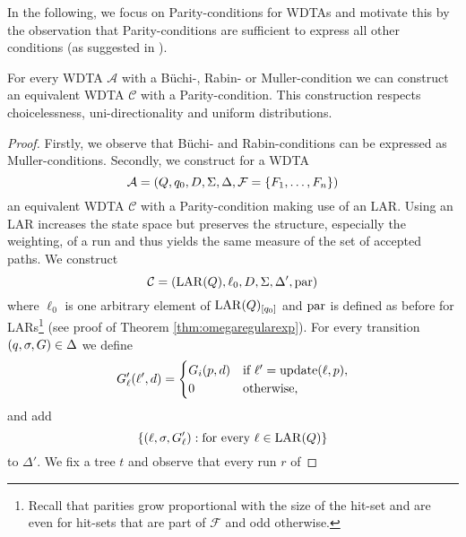 In the following, we focus on Parity-conditions for \acp{WDTA} and motivate
this by the observation that Parity-conditions are sufficient to express all
other conditions (as suggested in
\cite[page 24:9, Proposition 6]{RandAutoInfTrees}).
\begin{lemma}
  For every \ac{WDTA} $\mathcal{A}$ with a Büchi-, Rabin- or Muller-condition 
  we can construct an equivalent \ac{WDTA} $\mathcal{C}$ with a 
  Parity-condition. This construction respects choicelessness,
  uni-directionality and uniform distributions.
  \label{lem:wdtaparityexpressiveness}
\end{lemma}
\begin{proof}
  Firstly, we observe that Büchi- and Rabin-conditions can be expressed
  as Muller-conditions. Secondly, we construct for a 
  \ac{WDTA}
  \begin{equation*}
    \mathcal{A} = \left(
      Q, q_{0}, D, \Sigma, \Delta, \mathcal{F} = \left\{F_{1},\dots,F_{n}\right\}
    \right)
  \end{equation*}
  an equivalent \ac{WDTA} $\mathcal{C}$ with a Parity-condition making use of
  an \ac{LAR}. Using an \ac{LAR} increases the state space but preserves the 
  structure, especially the weighting, of a run and thus yields the same 
  measure of the set of accepted paths. We construct
  \begin{equation*}
    \mathcal{C}=\left(
      \operatorname{LAR}(Q),\ell_{0}, D, \Sigma, \Delta', \operatorname{par}
    \right)
  \end{equation*} 
  where $\ell_{0}$ is one arbitrary element of $\operatorname{LAR}(Q)_{\left[q_{0}\right]}$ and 
  $\operatorname{par}$ is defined as before for \acp{LAR}\footnote{
    Recall that parities grow proportional with the size of the hit-set and are 
    even for hit-sets that are part of $\mathcal{F}$ and odd otherwise.
  } (see proof of Theorem \ref{thm:omegaregularexp}). For every transition 
  $\left(q,\sigma,G\right)\in\Delta$ we define
  \begin{equation*}
    G_{\ell}'(\ell', d) = \begin{cases}
      G_{i}(p,d) &\text{if }\ell' = \operatorname{update}(\ell,p),\\
      0          &\text{otherwise,}
    \end{cases}
  \end{equation*}
  and add
  \begin{equation*}
    \left\{
      \left(\ell,\sigma,G_{\ell}'\right):\text{for every }\ell\in\operatorname{LAR}(Q)
    \right\}
  \end{equation*}
  to $\Delta'$. We fix a tree $t$ and observe that every run $r$ of 

\end{proof}
